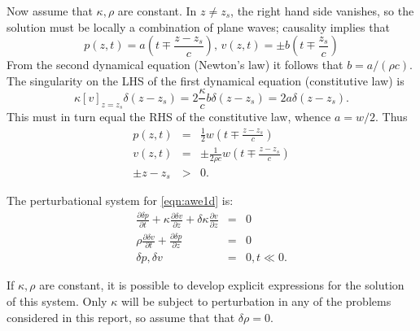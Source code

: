 Now assume that $\kappa, \rho$ are constant. 
In $z \ne z_s$, the right hand side 
vanishes, so the solution must be locally a combination of plane
waves; causality implies that
\[
p(z,t)=a\left(t \mp \frac{z-z_s}{c}\right), \, v(z,t)=\pm b\left(t \mp
  \frac{z_s}{c}\right)
\]
From the second dynamical equation (Newton's law) it follows that $b =
a/(\rho c)$. The singularity on the LHS of the first dynamical
equation (constitutive law) is
\[
\kappa [v]_{z=z_s}\delta(z-z_s) =
2\frac{\kappa}{c}b\delta(z-z_s) = 2a\delta(z-z_s).
\] 
This must in turn equal the RHS of the constitutive law, whence
$a=w/2$. Thus
\begin{eqnarray}
\label{eqn:sol1d}
p(z,t) &=& \frac{1}{2}w\left(t \mp \frac{z-z_s}{c}\right) \nonumber \\
v(z,t) &=& \pm\frac{1}{2\rho c}w\left(t \mp \frac{z-z_s}{c}\right)
           \nonumber \\
\pm z-z_s &>& 0.
\end{eqnarray}


The perturbational system for \ref{eqn:awe1d} is:
\begin{eqnarray}
\label{eqn:dawe1d}
\frac{\partial \delta p}{\partial t} +\kappa\frac{\partial
  \delta v}{\partial z} + \delta \kappa\frac{\partial
  v}{\partial z} &=& 0 \nonumber\\
\rho \frac{\partial \delta v}{\partial t} + \frac{\partial \delta p}{\partial
  z}&=&0\nonumber\\
\delta p,\delta v&=&0, t \ll 0.
\end{eqnarray}

If $\kappa, \rho $ are constant, it is possible to develop explicit
expressions for the solution of this system. Only $\kappa$ will be
subject to perturbation in any of the problems considered in this
report, so assume that that $\delta\rho=0$.

